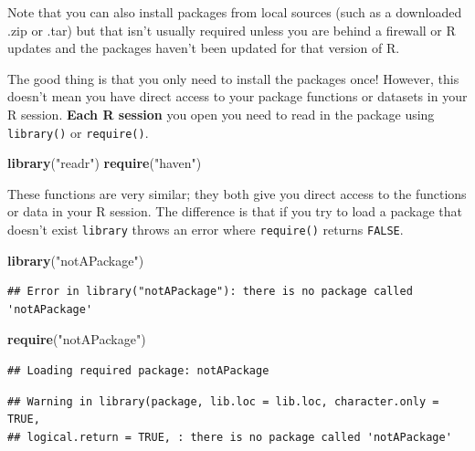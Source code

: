 \documentclass[
]{book}
\newenvironment{Shaded}{\begin{snugshade}}{\end{snugshade}}
\newcommand{\KeywordTok}[1]{\textcolor[rgb]{0.13,0.29,0.53}{\textbf{#1}}}
\newcommand{\NormalTok}[1]{#1}
\newcommand{\StringTok}[1]{\textcolor[rgb]{0.31,0.60,0.02}{#1}}
\theoremstyle{definition}
\theoremstyle{definition}
\theoremstyle{definition}
\theoremstyle{remark}
\begin{document}
Note that you can also install packages from local sources (such as a downloaded .zip or .tar) but that isn't usually required unless you are behind a firewall or R updates and the packages haven't been updated for that version of R.

The good thing is that you only need to install the packages once! However, this doesn't mean you have direct access to your package functions or datasets in your R session. \textbf{Each R session} you open you need to read in the package using \texttt{library()} or \texttt{require()}.

\begin{Shaded}
\begin{Highlighting}[]
\KeywordTok{library}\NormalTok{(}\StringTok{"readr"}\NormalTok{)}
\KeywordTok{require}\NormalTok{(}\StringTok{"haven"}\NormalTok{)}
\end{Highlighting}
\end{Shaded}

These functions are very similar; they both give you direct access to the functions or data in your R session. The difference is that if you try to load a package that doesn't exist \texttt{library} throws an error where \texttt{require()} returns \texttt{FALSE}.

\begin{Shaded}
\begin{Highlighting}[]
\KeywordTok{library}\NormalTok{(}\StringTok{"notAPackage"}\NormalTok{)}
\end{Highlighting}
\end{Shaded}

\begin{verbatim}
## Error in library("notAPackage"): there is no package called 'notAPackage'
\end{verbatim}

\begin{Shaded}
\begin{Highlighting}[]
\KeywordTok{require}\NormalTok{(}\StringTok{"notAPackage"}\NormalTok{)}
\end{Highlighting}
\end{Shaded}

\begin{verbatim}
## Loading required package: notAPackage
\end{verbatim}

\begin{verbatim}
## Warning in library(package, lib.loc = lib.loc, character.only = TRUE,
## logical.return = TRUE, : there is no package called 'notAPackage'
\end{verbatim}
\end{document}
